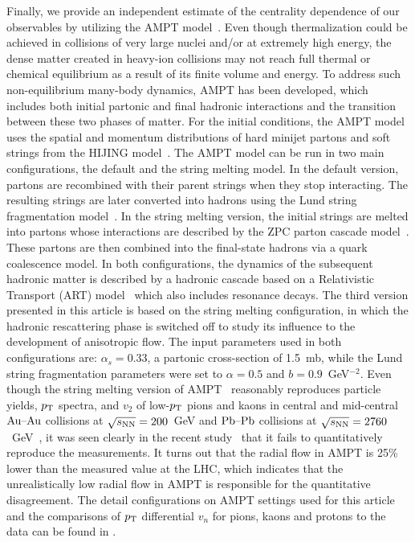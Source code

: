 \documentclass[ALICE,manyauthors]{cernphprep}
\begin{document}
Finally, we provide an independent estimate of the centrality dependence of our observables by utilizing the {AMPT} model~\cite{Zhang:1999bd,Lin:2000cx,Lin:2004en}.
Even though thermalization could be achieved in collisions of very large nuclei and/or at extremely high energy, the dense matter created in heavy-ion collisions may not reach full thermal or chemical equilibrium as a result of its finite volume and energy. To address such non-equilibrium many-body dynamics, AMPT has been developed, which includes both initial partonic and final hadronic interactions and the transition between these two phases of matter.
For the initial conditions, the AMPT model uses the spatial and momentum distributions of hard minijet partons and soft strings from the HIJING model~\cite{Wang:1991hta,Gyulassy:1994ew}.
The AMPT model can be run in two main configurations, the default and the string melting model.
In the default version, partons are recombined with their parent strings when they stop interacting. The resulting strings are later converted into hadrons using the Lund string fragmentation model~\cite{Andersson:1986gw,NilssonAlmqvist:1986rx}. In the string melting version, the initial strings are melted into partons whose interactions are described by the ZPC parton cascade model~\cite{Zhang:1997ej}. These partons are then combined into the final-state hadrons via a quark coalescence model. 
In both configurations, the dynamics of the subsequent hadronic matter is described by a hadronic cascade based on a Relativistic Transport (ART) model~\cite{Li:2001xh} which also includes resonance decays.
The third version presented in this article is based on the string melting configuration, in which the hadronic rescattering phase is switched off to study its influence to the development of anisotropic flow.
The input parameters used in both configurations are: $\alpha_s = 0.33$, a partonic cross-section of 1.5~mb, while the Lund string fragmentation parameters were set to $\alpha = 0.5$ and $b = 0.9$~GeV$^{-2}$. 
Even though the string melting version of AMPT~\cite{Lin:2001zk,Lin:2004en} reasonably reproduces particle yields, $p_{\textnormal{T}}$ spectra, and $v_2$ of low-$p_{\textnormal{T}}$ pions and kaons in central and mid-central $\textnormal{Au--Au}$ collisions at $\sqrt{s_{\textnormal{NN}}}=200$~GeV and $\textnormal{Pb--Pb}$ collisions at $\sqrt{s_{\textnormal{NN}}}=2760$~GeV~\cite{Lin:2014tya}, it was seen clearly in the recent study~\cite{Adam:2016nfo} that it fails to quantitatively reproduce the measurements. It turns out that the radial flow in AMPT is 25\% lower than the measured value at the LHC, which indicates that the unrealistically low radial flow in AMPT is responsible for the quantitative disagreement. The detail configurations on AMPT settings used for this article and the comparisons of $p_{\rm T}$ differential $v_{n}$ for pions, kaons and protons to the data can be found in \cite{Adam:2016nfo}.
\end{document}
